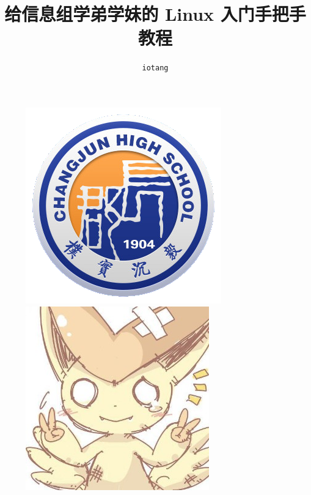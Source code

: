 \documentclass[UTF-8]{ctexart}
\title{\textbf{\huge 给信息组学弟学妹的 Linux 入门手把手教程}}
\author{\texttt{iotang}}
\begin{document}
	\maketitle
	
	\begin{figure}[H]
		\centering
		\begin{minipage}{0.15\textwidth}
			\centering
			\includegraphics[width=\textwidth]{fig/cj.png}
			\caption*{}
		\end{minipage}
		\begin{minipage}{0.15\textwidth}
			\centering
			\includegraphics[width=\textwidth]{fig/iotang_victini.jpg}

\end{minipage}
\end{figure}
\end{document}
